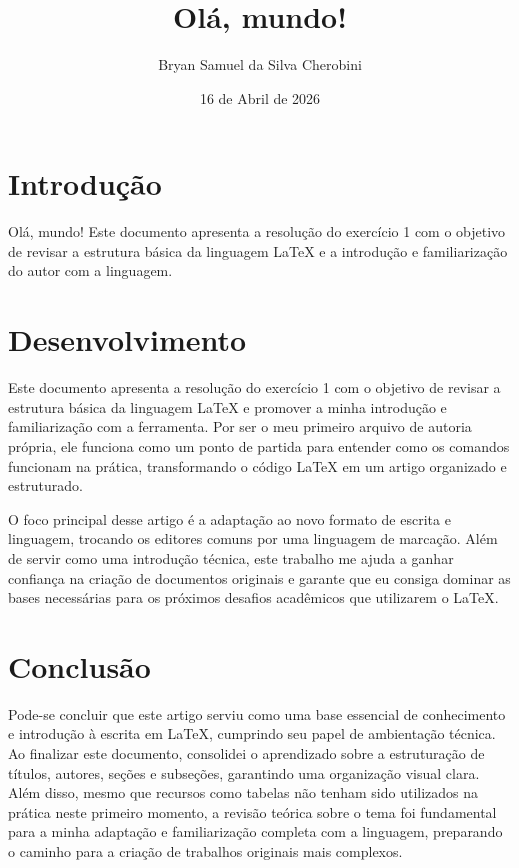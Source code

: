 \documentclass{article}
\title{Olá, mundo!}
\author{Bryan Samuel da Silva Cherobini}
\date{16 de Abril de 2026}
\begin{document}
\maketitle

\section{Introdução}


Olá, mundo!
Este documento apresenta a resolução do exercício 1 com o objetivo de revisar a estrutura básica da linguagem LaTeX e a introdução e familiarização do autor com a linguagem.

\section{Desenvolvimento}

Este documento apresenta a resolução do exercício 1 com o objetivo de revisar a estrutura básica da linguagem LaTeX e promover a minha introdução e familiarização com a ferramenta. Por ser o meu primeiro arquivo de autoria própria, ele funciona como um ponto de partida para entender como os comandos funcionam na prática, transformando o código LaTeX em um artigo organizado e estruturado.

O foco principal desse artigo é a adaptação ao novo formato de escrita e linguagem, trocando os editores comuns por uma linguagem de marcação. Além de servir como uma introdução técnica, este trabalho me ajuda a ganhar confiança na criação de documentos originais e garante que eu consiga dominar as bases necessárias para os próximos desafios acadêmicos que utilizarem o LaTeX.

\section{Conclusão}

Pode-se concluir que este artigo serviu como uma base essencial de conhecimento e introdução à escrita em LaTeX, cumprindo seu papel de ambientação técnica. Ao finalizar este documento, consolidei o aprendizado sobre a estruturação de títulos, autores, seções e subseções, garantindo uma organização visual clara. Além disso, mesmo que recursos como tabelas não tenham sido utilizados na prática neste primeiro momento, a revisão teórica sobre o tema foi fundamental para a minha adaptação e familiarização completa com a linguagem, preparando o caminho para a criação de trabalhos originais mais complexos.
\end{document}
